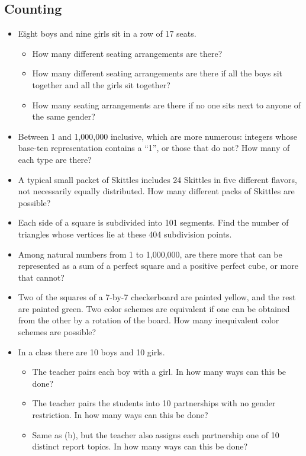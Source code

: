 \documentclass[12pt]{article}
\begin{document}
\subsection{Counting}
\begin{itemize}
  \item Eight boys and nine girls sit in a row of 17 seats.
  \begin{itemize}
    \item How many different seating arrangements are there?
    \item How many different seating arrangements are there if all the boys sit together and all the girls sit together?
    \item How many seating arrangements are there if no one sits next to anyone of the same gender?
  \end{itemize}

  \item Between 1 and 1,000,000 inclusive, which are more numerous: integers whose base-ten representation contains a ``1'', or those that do not? How many of each type are there?

  \item A typical small packet of Skittles includes 24 Skittles in five different flavors, not necessarily equally distributed. How many different packs of Skittles are possible?

  \item Each side of a square is subdivided into 101 segments. Find the number of triangles whose vertices lie at these 404 subdivision points.

  \item Among natural numbers from 1 to 1,000,000, are there more that can be represented as a sum of a perfect square and a positive perfect cube, or more that cannot?

  \item Two of the squares of a 7-by-7 checkerboard are painted yellow, and the rest are painted green. Two color schemes are equivalent if one can be obtained from the other by a rotation of the board. How many inequivalent color schemes are possible?

  \item In a class there are 10 boys and 10 girls.
  \begin{itemize}
    \item The teacher pairs each boy with a girl. In how many ways can this be done?
    \item The teacher pairs the students into 10 partnerships with no gender restriction. In how many ways can this be done?
    \item Same as (b), but the teacher also assigns each partnership one of 10 distinct report topics. In how many ways can this be done?
  \end{itemize}


\end{itemize}
\end{document}
